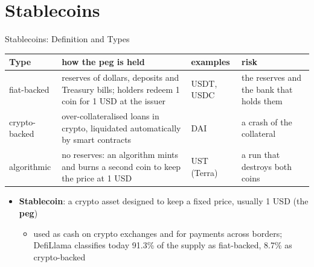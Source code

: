 \section{Stablecoins}

\begin{frame}{Stablecoins: Definition and Types}
\itemsize{\footnotesize}
\begin{center}
\scriptsize
\begin{tabular}{>{\raggedright\arraybackslash}p{2.2cm}>{\raggedright\arraybackslash}p{4.4cm}>{\raggedright\arraybackslash}p{2.0cm}>{\raggedright\arraybackslash}p{2.4cm}}
\toprule
Type & how the peg is held & examples & risk \\
\midrule
fiat-backed & reserves of dollars, deposits and Treasury bills; holders redeem 1 coin for 1 USD at the issuer & USDT, USDC & the reserves and the bank that holds them \\
crypto-backed & over-collateralised loans in crypto, liquidated automatically by smart contracts & DAI & a crash of the collateral \\
algorithmic & no reserves: an algorithm mints and burns a second coin to keep the price at 1 USD & UST (Terra) & a run that destroys both coins \\
\bottomrule
\end{tabular}
\end{center}
\begin{itemize}
    \item \textbf{Stablecoin}: a crypto asset designed to keep a fixed price, usually 1 USD (the \textbf{peg})
    \begin{itemize}
        \item used as cash on crypto exchanges and for payments across borders; DefiLlama classifies today 91.3\% of the supply as fiat-backed, 8.7\% as crypto-backed
    \end{itemize}
\end{itemize}
\end{frame}

